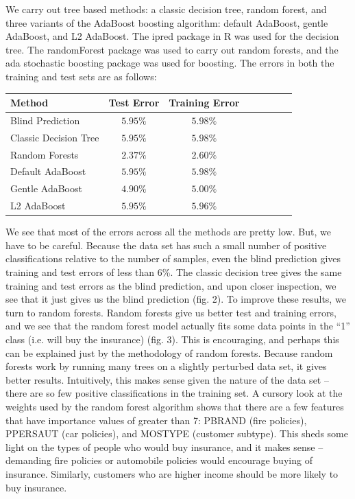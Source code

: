 \documentclass[a4paper,10pt]{article}
\begin{document}
We carry out tree based methods: a classic decision tree, random forest, and three variants
of the AdaBoost boosting algorithm: default AdaBoost, gentle AdaBoost, and L2 AdaBoost. The
ipred package in R was used for the decision tree. The randomForest package was used to carry
out random forests, and the ada stochastic boosting package was used for boosting. The errors
in both the training and test sets are as follows:

\begin{tabular}{l*{6}{c}r}
 Method		& Test Error & Training Error \\
 \hline
 Blind Prediction	& $5.95\%$ & $5.98\%$ \\
 Classic Decision Tree	& $5.95\%$ & $5.98\%$ \\
 Random Forests 	& $2.37\%$ & $2.60\%$ \\
 Default AdaBoost	& $5.95\%$ & $5.98\%$ \\
 Gentle AdaBoost	& $4.90\%$ & $5.00\%$ \\
 L2 AdaBoost		& $5.95\%$ & $5.96\%$ \\
\end{tabular}

We see that most of the errors across all the methods are pretty low. But, we have to be careful.
Because the data set has such a small number of positive classifications relative to the number
of samples, even the blind prediction gives training and test errors of less than 6\%. The
classic decision tree gives the same training and test errors as the blind prediction, and upon
closer inspection, we see that it just gives us the blind prediction (fig. 2). To improve these
results, we turn to random forests. Random forests give us better test and training errors, and
we see that the random forest model actually fits some data points in the ``1'' class (i.e. 
will buy the insurance) (fig. 3). This is encouraging, and perhaps this can be explained just
by the methodology of random forests. Because random forests work by running many trees on a
slightly perturbed data set, it gives better results. Intuitively, this makes sense given the 
nature of the data set -- there are so few positive classifications in the training set. A cursory
look at the weights used by the random forest algorithm shows that there are a few features that
have importance values of greater than 7: PBRAND (fire policies), PPERSAUT (car policies), and MOSTYPE (customer
subtype). This sheds some light on the types of people who would buy insurance, and it makes sense --
demanding fire policies or automobile policies would encourage buying of insurance. Similarly, customers
who are higher income should be more likely to buy insurance.
\end{document}
